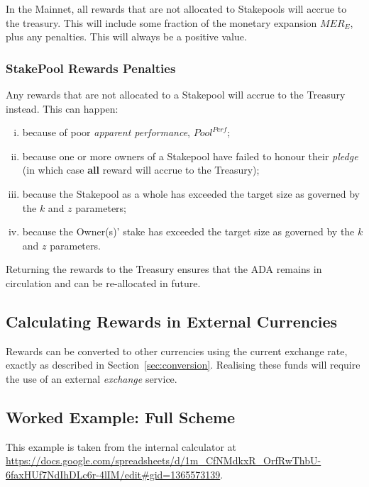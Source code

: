 \documentclass[11pt,a4paper,dvipsnames,twosided,final]{article}
\newcommand{\khcomment}[1]{\todo[color=blue!20]{KH: #1}}
\newcommand{\ada}{ADA{}}
\begin{document}
In the Mainnet, all rewards that are not allocated to Stakepools will accrue to the treasury.  This will include some fraction of the
monetary expansion $\textit{MER}_E$, plus any penalties.  This will always be a positive value.

\subsubsection*{StakePool Rewards Penalties}

Any rewards that are not allocated to a Stakepool will accrue to the Treasury instead.  This can happen: %

\begin{enumerate}[i)]
\item
  because of poor \emph{apparent performance}, $\textit{Pool}^{\textit{Perf}}$;
\item
  because one or more owners of a Stakepool have failed to honour their \emph{pledge} (in which case \textbf{all} reward will accrue to the Treasury);
\item
  because the Stakepool as a whole has exceeded the target size as governed by the $k$ and $z$ parameters;
\item
  because the Owner(s)' stake has exceeded the target size as governed by the $k$ and $z$ parameters.
\end{enumerate}

\noindent
Returning the rewards to the Treasury ensures that the \ada{} remains in circulation and can be re-allocated in future.



\subsection{Calculating Rewards in External Currencies}

Rewards can be converted to other currencies using the current exchange rate, exactly as described in
Section~\ref{sec:conversion}.  Realising these funds will require the use of an external \emph{exchange} service.

\clearpage
\subsection{Worked Example: Full Scheme}

This example is taken from the \IOHK{} internal calculator at
\url{https://docs.google.com/spreadsheets/d/1m_CfNMdkxR_OrfRwThbU-6faxHUf7NdIhDLc6r-4lIM/edit#gid=1365573139}.
\end{document}
